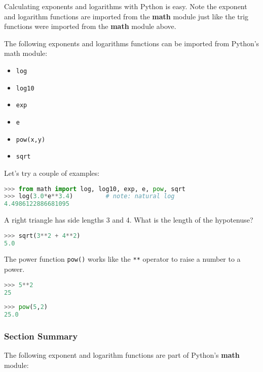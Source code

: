 \documentclass{book}
\providecommand{\tightlist}{%
      \setlength{\itemsep}{0pt}\setlength{\parskip}{0pt}}
\newcommand{\passthrough}[1]{#1}
\begin{document}
Calculating exponents and logarithms with Python is easy. Note the
exponent and logarithm functions are imported from the \textbf{math}
module just like the trig functions were imported from the \textbf{math}
module above.

The following exponents and logarithms functions can be imported from
Python's math module:

\begin{itemize}
\tightlist
\item
  \passthrough{\lstinline!log!}
\item
  \passthrough{\lstinline!log10!}
\item
  \passthrough{\lstinline!exp!}
\item
  \passthrough{\lstinline!e!}
\item
  \passthrough{\lstinline!pow(x,y)!}
\item
  \passthrough{\lstinline!sqrt!}
\end{itemize}

Let's try a couple of examples:

\begin{lstlisting}[language=Python]
>>> from math import log, log10, exp, e, pow, sqrt
>>> log(3.0*e**3.4)         # note: natural log
4.4986122886681095
\end{lstlisting}

A right triangle has side lengths 3 and 4. What is the length of the
hypotenuse?

\begin{lstlisting}[language=Python]
>>> sqrt(3**2 + 4**2)
5.0 
\end{lstlisting}

The power function \passthrough{\lstinline!pow()!} works like the
\passthrough{\lstinline!**!} operator to raise a number to a power.

\begin{lstlisting}[language=Python]
>>> 5**2
25
\end{lstlisting}

\begin{lstlisting}[language=Python]
>>> pow(5,2)
25.0
\end{lstlisting}

\hypertarget{section-summary}{%
\subsubsection{Section Summary}\label{section-summary}}

The following exponent and logarithm functions are part of Python's
\textbf{math} module:
\end{document}
